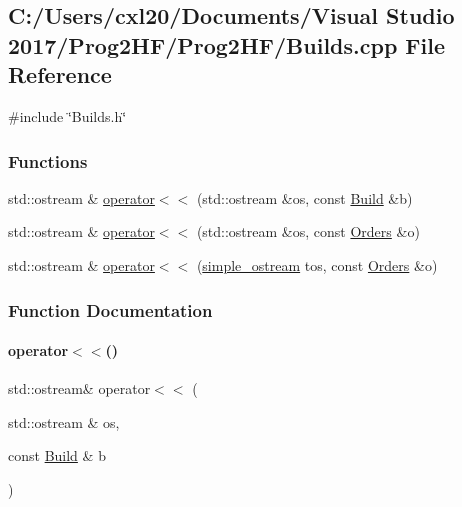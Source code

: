 \subsection{C\+:/\+Users/cxl20/\+Documents/\+Visual Studio 2017/\+Prog2\+H\+F/\+Prog2\+H\+F/\+Builds.cpp File Reference}
\label{_builds_8cpp}
{\ttfamily \#include \char`\"{}Builds.\+h\char`\"{}}\newline
\subsubsection*{Functions}
\begin{DoxyCompactItemize}
\item 
std\+::ostream \& \mbox{\hyperlink{_builds_8cpp_a8dc72915bcebaea777be339661524cb9}{operator$<$$<$}} (std\+::ostream \&os, const \mbox{\hyperlink{class_build}{Build}} \&b)
\item 
std\+::ostream \& \mbox{\hyperlink{_builds_8cpp_a5fb6be27fb40218ba8338cb8727178cd}{operator$<$$<$}} (std\+::ostream \&os, const \mbox{\hyperlink{class_orders}{Orders}} \&o)
\item 
std\+::ostream \& \mbox{\hyperlink{_builds_8cpp_a6125e4e6c603847e74d5f5ccb05da74e}{operator$<$$<$}} (\mbox{\hyperlink{structsimple__ostream}{simple\+\_\+ostream}} tos, const \mbox{\hyperlink{class_orders}{Orders}} \&o)
\end{DoxyCompactItemize}


\subsubsection{Function Documentation}
\mbox{\label{_builds_8cpp_a8dc72915bcebaea777be339661524cb9}} 
\paragraph{\texorpdfstring{operator$<$$<$()}{operator<<()}\hspace{0.1cm}{\footnotesize\ttfamily [1/3]}}
{\footnotesize\ttfamily std\+::ostream\& operator$<$$<$ (\begin{DoxyParamCaption}\item[{std\+::ostream \&}]{os,  }\item[{const \mbox{\hyperlink{class_build}{Build}} \&}]{b }\end{DoxyParamCaption})}

